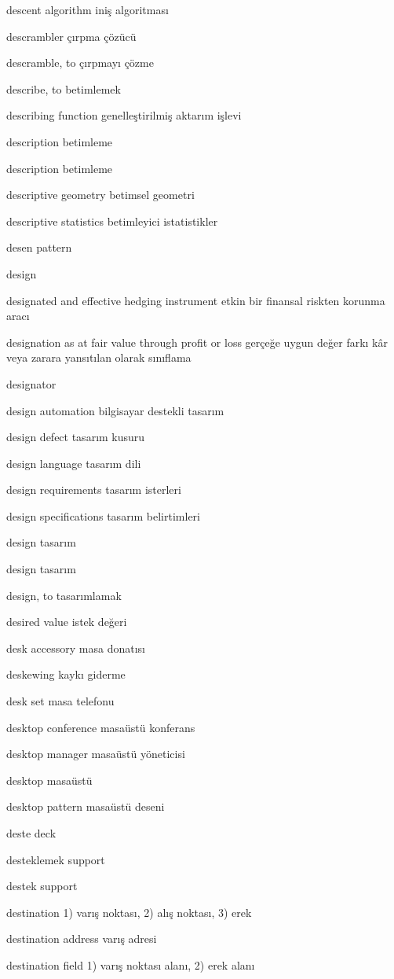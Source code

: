 \documentclass[12pt,fleqn]{article}\usepackage{../../common}
\begin{document}
descent algorithm iniş algoritması

descrambler çırpma çözücü

descramble, to çırpmayı çözme

describe, to betimlemek

describing function genelleştirilmiş aktarım işlevi

description betimleme

description betimleme

descriptive geometry betimsel geometri

descriptive statistics betimleyici istatistikler

desen pattern

design

designated and effective hedging instrument etkin bir finansal riskten korunma aracı

designation as at fair value through profit or loss gerçeğe uygun değer farkı kâr veya zarara yansıtılan olarak sınıflama

designator

design automation bilgisayar destekli tasarım

design defect tasarım kusuru

design language tasarım dili

design requirements tasarım isterleri

design specifications tasarım belirtimleri

design tasarım

design tasarım

design, to tasarımlamak

desired value istek değeri

desk accessory masa donatısı

deskewing kaykı giderme

desk set masa telefonu

desktop conference masaüstü konferans

desktop manager masaüstü yöneticisi

desktop masaüstü

desktop pattern masaüstü deseni

deste deck

desteklemek support

destek support

destination 1) varış noktası, 2) alış noktası, 3) erek

destination address varış adresi

destination field 1) varış noktası alanı, 2) erek alanı
\end{document}
